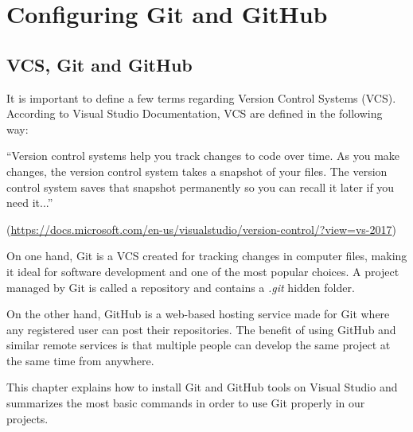 \chapter{Configuring Git and GitHub}

    \section{VCS, Git and GitHub}
    
    It is important to define a few terms regarding Version Control Systems (VCS). According to Visual Studio Documentation, VCS are defined in the following way:
    
    \begin{center}
        \begin{minipage}{0.7\linewidth}
            \vspace{5pt}        %
            {\small
                ``Version control systems help you track changes to code over time. 
                As you make changes, the version control system takes a snapshot of 
                your files. The version control system saves that snapshot 
                permanently so you can recall it later if you need it...''
            }
            \begin{flushright}
                (\url{https://docs.microsoft.com/en-us/visualstudio/version-control/?view=vs-2017})
            \end{flushright}
            \vspace{5pt}%
        \end{minipage}
    \end{center}
    
    On one hand, Git is a VCS created for tracking changes in computer files, making it ideal for software development and one of the most popular choices. A project managed by Git is called a repository and contains a \textit{.git} hidden folder.
    
    On the other hand, GitHub is a web-based hosting service made for Git where any registered user can post their repositories. The benefit of using GitHub and similar remote services is that multiple people can develop the same project at the same time from anywhere.
    
    This chapter explains how to install Git and GitHub tools on Visual Studio and summarizes the most basic commands in order to use Git properly in our projects. 
    
